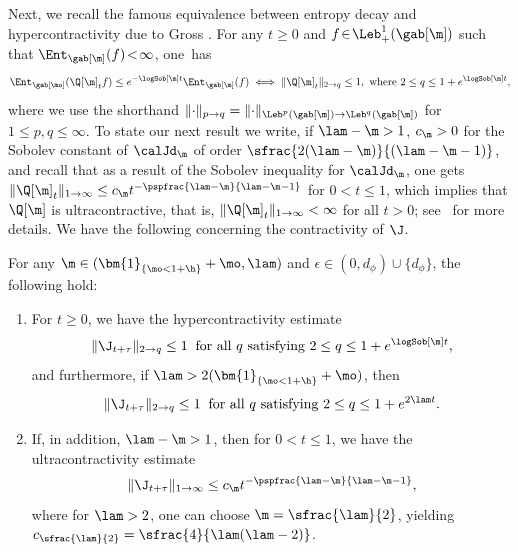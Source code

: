 Next, we recall the famous equivalence between entropy decay and hypercontracti\-vity due to Gross \cite{Gross}. For any $t\!\geq\!0$ and $f\!\in\!\Leb^1_+(\gab[\m])$ such that $\Ent_{\gab[\m]}(f)\!<\!\infty$, one~has
\begin{equation*}
\Ent_{\gab[\mo]} (\Q[\m]_tf) \leq e^{- \logSob[\m] t} \Ent_{\gab[\m]} (f) \iff \|\Q[\m]_t \|_{2 \to q} \leq 1, \textrm{ where } 2\leq q \leq 1+e^{ \logSob[\m] t},
\end{equation*}
where we use the shorthand $\|{\cdot}\|_{p \to q} = \|{\cdot}\|_{\Leb^p(\gab[\m]) \to \Leb^q(\gab[\m])}$ for $1 \leq p, q \leq \infty$. To state our next result we write, if $\lam - \m > 1$, $c_{\m} > 0$ for the Sobolev constant of $\calJd_\m$ of order $\sfrac{2(\lam-\m)}{(\lam-\m-1)}$, and recall that as a result of the Sobolev inequality for $\calJd_\m$, one gets $\|\Q[\m]_t\|_{1 \to \infty} \leq c_{\m} t^{-\pspfrac{\lam-\m}{\lam-\m-1}}$ for $0 < t \leq 1$, which implies that $\Q[\m]$ is ultracontractive,
that is, $\|\Q[\m]_t\|_{1 \to \infty} < \infty$ for all $t > 0$; see~ for more details. We have the following concerning the contractivity of $\J$.

\begin{theorem}
\label{thm:contractivity}
For any $\m \in (\bm{1}_{\{\mo < 1+\h\}} + \mo , \lam)$ and $\epsilon \in (0,d_\phi) \cup \{d_\phi\}$, the following hold:
\begin{enumerate}
\item \label{item-1:thm:contractivity} For $t \geq 0$, we have the hypercontractivity estimate
\begin{equation*}
\|\J_{t+\tau}\|_{2 \to q} \leq 1 \: \text{ for all } q \text{ satisfying } 2\leq q \leq 1+e^{ \logSob[\m] t},
\end{equation*}
and furthermore, if $\lam > 2(\bm{1}_{\{\mo < 1+\h \}} + \mo)$, then
\begin{equation*}
\|\J_{t+\tau}\|_{2 \to q} \leq 1 \: \text{ for all } q \text{ satisfying }2\leq q \leq 1+e^{2\lam t}.
\end{equation*}
\item \label{item-2:thm:contractivity} If, in addition, $\lam-\m > 1$, then for $0 < t \leq 1$, we have the ultracontractivity estimate
\begin{equation*}
\|\J_{t+\tau}\|_{1 \to \infty} \leq c_{\m} t^{-\pspfrac{\lam-\m}{\lam-\m-1}},
\end{equation*}
where for $\lam> 2$, one can choose $\m=\sfrac{\lam}{2}$, yielding $c_{\sfrac{\lam}{2}}=\sfrac{4}{\lam(\lam- 2)}$.
\end{enumerate}
\end{theorem}

